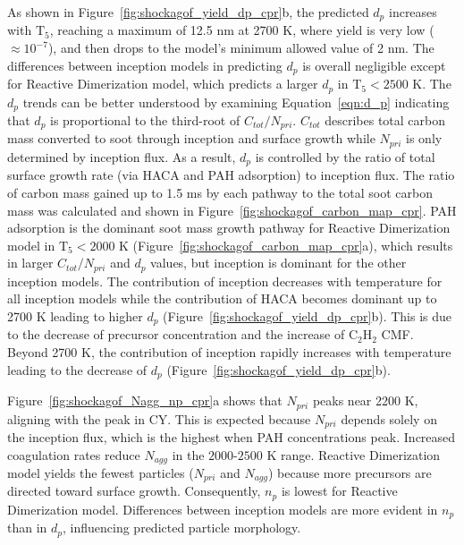 As shown in Figure~\ref{fig:shockagof_yield_dp_cpr}b, the predicted $d_p$ increases with $\mathrm{T_5}$, reaching a maximum of 12.5 nm at 2700 K, where yield is very low ($\approx 10^{-7}$), and then drops to the model's minimum allowed value of 2 nm. The differences between inception models in predicting $d_p$ is overall negligible except for Reactive Dimerization model, which predicts a larger $d_p$ in $\mathrm{T_5}<2500$ K. The $d_p$ trends can be better understood by examining Equation~\eqref{eqn:d_p} indicating that $d_p$ is proportional to the third-root of $C_{tot}/N_{pri}$. $C_{tot}$ describes total carbon mass converted to soot through inception and surface growth while $N_{pri}$ is only determined by inception flux. As a result, $d_p$ is controlled by the ratio of total surface growth rate (via HACA and PAH adsorption) to inception flux. The ratio of carbon mass gained up to 1.5 ms by each pathway to the total soot carbon mass was calculated and shown in Figure~\ref{fig:shockagof_carbon_map_cpr}. PAH adsorption is the dominant soot mass growth pathway for Reactive Dimerization model in $\mathrm{T_5}<2000$ K (Figure~\ref{fig:shockagof_carbon_map_cpr}a), which results in larger $C_{tot}/N_{pri}$ and $d_p$ values, but inception is dominant for the other inception models. The contribution of inception decreases with temperature for all inception models while the contribution of HACA becomes dominant up to 2700 K leading to higher $d_p$ (Figure~\ref{fig:shockagof_yield_dp_cpr}b). This is due to the decrease of precursor concentration and the increase of $\mathrm{C_2H_2}$ CMF. Beyond 2700 K, the contribution of inception rapidly increases with temperature leading to the decrease of $d_p$ (Figure~\ref{fig:shockagof_yield_dp_cpr}b).


Figure~\ref{fig:shockagof_Nagg_np_cpr}a shows that $N_{pri}$ peaks near 2200 K, aligning with the peak in CY. This is expected because $N_{pri}$ depends solely on the inception flux, which is the highest when PAH concentrations peak. Increased coagulation rates reduce $N_{agg}$ in the $2000$-$2500$ K range. Reactive Dimerization model yields the fewest particles ($N_{pri}$ and $N_{agg}$) because more precursors are directed toward surface growth. Consequently, $n_p$ is lowest for Reactive Dimerization model. Differences between inception models are more evident in $n_p$ than in $d_p$, influencing predicted particle morphology.

